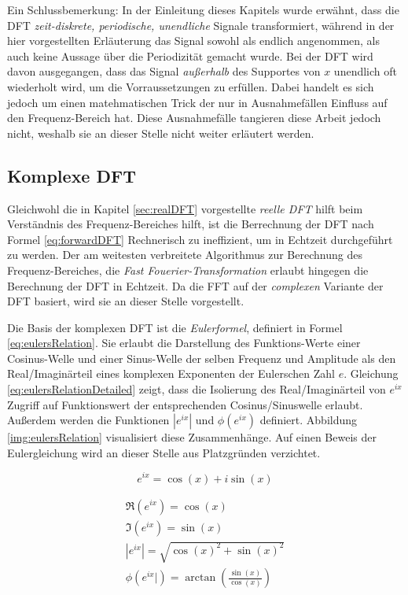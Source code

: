 Ein Schlussbemerkung: In der Einleitung dieses Kapitels wurde erwähnt, dass die DFT \emph{zeit-diskrete, periodische, unendliche} Signale transformiert, während in der hier vorgestellten Erläuterung das Signal sowohl als endlich angenommen, als auch keine Aussage über die Periodizität gemacht wurde. Bei der DFT wird davon ausgegangen, dass das Signal \emph{außerhalb} des Supportes von $x$ unendlich oft wiederholt wird, um die Vorraussetzungen zu erfüllen. Dabei handelt es sich jedoch um einen \glqq matehmatischen Trick \grqq{} der nur in Ausnahmefällen Einfluss auf den Frequenz-Bereich hat. Diese Ausnahmefälle tangieren diese Arbeit jedoch nicht, weshalb sie an dieser Stelle nicht weiter erläutert werden.\cite[S. 145]{dspGuide}

\subsection{Komplexe DFT}
\label{sec:comDFT}

Gleichwohl die in Kapitel \ref{sec:realDFT} vorgestellte \emph{reelle DFT} hilft beim Verständnis des Frequenz-Bereiches hilft, ist die Berrechnung der DFT nach Formel \ref{eq:forwardDFT} Rechnerisch zu ineffizient, um in Echtzeit durchgeführt zu werden. Der am weitesten verbreitete Algorithmus zur Berechnung des Frequenz-Bereiches, die \emph{Fast Fouerier-Transformation} erlaubt hingegen die Berechnung der DFT in Echtzeit. Da die FFT auf der \emph{complexen} Variante der DFT basiert, wird sie an dieser Stelle vorgestellt. \cite[S. 225]{dspGuide}

Die Basis der komplexen DFT ist die \emph{Eulerformel}, definiert in Formel \ref{eq:eulersRelation}. Sie erlaubt die Darstellung des Funktions-Werte einer Cosinus-Welle und einer Sinus-Welle der selben Frequenz und Amplitude als den Real/Imaginärteil eines komplexen Exponenten der Eulerschen Zahl $e$. Gleichung \ref{eq:eulersRelationDetailed} zeigt, dass die Isolierung des Real/Imaginärteil von $e^{ix}$ Zugriff auf Funktionswert der entsprechenden Cosinus/Sinuswelle erlaubt. Außerdem werden die Funktionen $|e^{ix}|$ und $\phi(e^{ix})$ definiert. Abbildung \ref{img:eulersRelation} visualisiert diese Zusammenhänge. Auf einen Beweis der Eulergleichung wird an dieser Stelle aus Platzgründen verzichtet. \cite[S. 569]{dspGuide}

\begin{equation}
e^{ix} = \cos(x) + i\sin(x)
\label{eq:eulersRelation}
\end{equation}

\begin{equation}
\begin{gathered}
\Re(e^{ix}) = \cos(x) \\
\Im(e^{ix}) = \sin(x)  \\
|e^{ix}| = \sqrt{\cos(x)^2 + \sin(x)^2} \\
\phi (e^{ix}|) = \arctan (\frac{\sin(x)}{\cos(x)})
\end{gathered}
\label{eq:eulersRelationDetailed}
\end{equation}


